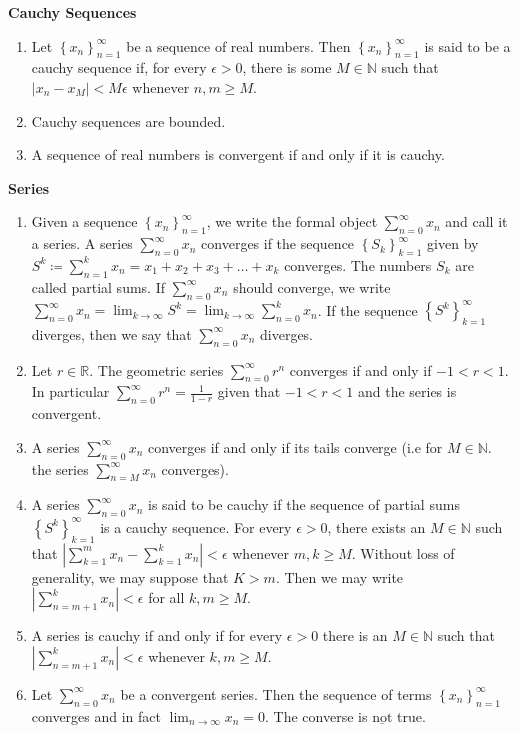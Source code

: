 \documentclass[12pt]{article}
\newcommand{\limit}[1]{\displaystyle \lim_{ {#1} }}
\newcommand{\limtoinf}[1][n]{\displaystyle\lim_{ {#1} \to \infty}}
\newcommand{\abs}[1]{\left| {#1} \right|}
\newcommand{\seq}[2][n]{\left\{ {#2} \right\}_{#1=1}^\infty}
\newcommand{\series}[2]{\displaystyle \sum_{ {#1} }^{ {#2} }}
\newcommand{\bR}{\mathbb{R}}
\newcommand{\bN}{\mathbb{N}}
\begin{document}
\noindent \textbf{Cauchy Sequences}

\begin{enumerate}
	\item Let $\seq{x_n}$ be a sequence of real numbers. Then $\seq{x_n}$ is said to be a cauchy sequence if, for every $\epsilon>0$, there is some $M\in\bN$ such that $\abs{x_n-x_M}<M\epsilon$ whenever $n,m\ge M$.
	\item Cauchy sequences are bounded.
	\item A sequence of real numbers is convergent if and only if it is cauchy.
\end{enumerate}

\noindent \textbf{Series}

\begin{enumerate}
	\item Given a sequence $\seq{x_n}$, we write the formal object $\series{n=0}{\infty} x_n$ and call it a series. A series $\series{n=0}{\infty} x_n$ converges if the sequence $\seq[k]{S_k}$ given by $S^k\coloneq\series{n=1}{k} x_n = x_1+x_2+x_3+\dots+x_k$ converges. The numbers $S_k$ are called partial sums. If $\series{n=0}{\infty} x_n$ should converge, we write $\series{n=0}{\infty} x_n=\limit{k\to\infty} S^k=\limit{k\to\infty}\series{n=0}{k} x_n$. If the sequence $\seq[k]{S^k}$ diverges, then we say that $\series{n=0}{\infty} x_n$ diverges.
	\item Let $r\in\bR$. The geometric series $\series{n=0}{\infty} r^n$ converges if and only if $-1<r<1$. In particular $\series{n=0}{\infty} r^n=\frac{1}{1-r}$ given that $-1<r<1$ and the series is convergent.
	\item A series $\series{n=0}{\infty} x_n$ converges if and only if its tails converge (i.e for $M\in\bN$. the series $\series{n=M}{\infty} x_n$ converges).
	\item A series $\series{n=0}{\infty} x_n$ is said to be cauchy if the sequence of partial sums $\seq[k]{S^k}$ is a cauchy sequence. For every $\epsilon > 0$, there exists an $M\in\bN$ such that $\abs{\series{k=1}{m} x_n-\series{k=1}{k} x_n}<\epsilon$ whenever $m, k\ge M$. Without loss of generality, we may suppose that $K>m$. Then we may write $\abs{\series{n=m+1}{k} x_n}<\epsilon$ for all $k,m\ge M$.
	\item A series is cauchy if and only if for every $\epsilon>0$ there is an $M\in\bN$ such that $\abs{\series{n=m+1}{k} x_n}<\epsilon$ whenever $k,m \ge M$.
	\item Let $\series{n=0}{\infty} x_n$ be a convergent series. Then the sequence of terms $\seq{x_n}$ converges and in fact $\limtoinf x_n=0$. The converse is $\underline{\text{not}}$ true.

\end{enumerate}
\end{document}
